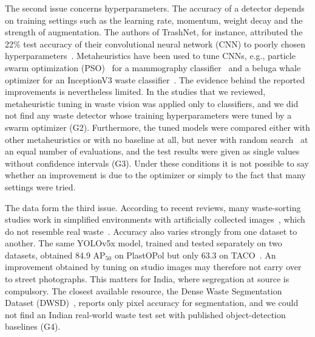 The second issue concerns hyperparameters. The accuracy of a detector depends on training settings such as the learning rate, momentum, weight decay and the strength of augmentation. The authors of TrashNet, for instance, attributed the 22\% test accuracy of their convolutional neural network (CNN) to poorly chosen hyperparameters~\cite{yang2016classification}. Metaheuristics have been used to tune CNNs, e.g., particle swarm optimization (PSO)~\cite{kennedy1995particle} for a mammography classifier~\cite{aguerchi2024cnn} and a beluga whale optimizer for an InceptionV3 waste classifier~\cite{sayed2024intelligent}. The evidence behind the reported improvements is nevertheless limited. In the studies that we reviewed, metaheuristic tuning in waste vision was applied only to classifiers, and we did not find any waste detector whose training hyperparameters were tuned by a swarm optimizer (G2). Furthermore, the tuned models were compared either with other metaheuristics or with no baseline at all, but never with random search~\cite{bergstra2012random} at an equal number of evaluations, and the test results were given as single values without confidence intervals (G3). Under these conditions it is not possible to say whether an improvement is due to the optimizer or simply to the fact that many settings were tried.

The data form the third issue. According to recent reviews, many waste-sorting studies work in simplified environments with artificially collected images~\cite{lu2022computer}, which do not resemble real waste~\cite{fang2023artificial}. Accuracy also varies strongly from one dataset to another. The same YOLOv5x model, trained and tested separately on two datasets, obtained 84.9 AP$_{50}$ on PlastOPol but only 63.3 on TACO~\cite{cordova2022litter}. An improvement obtained by tuning on studio images may therefore not carry over to street photographs. This matters for India, where segregation at source is compulsory. The closest available resource, the Dense Waste Segmentation Dataset (DWSD)~\cite{ali2025dwsd}, reports only pixel accuracy for segmentation, and we could not find an Indian real-world waste test set with published object-detection baselines (G4).

